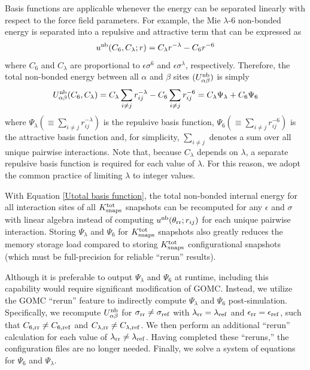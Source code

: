 \documentclass[journal=jced,manuscript=article]{achemso}
\begin{document}
Basis functions are applicable whenever the energy can be separated linearly with respect to the force field parameters. For example, the Mie $\lambda$-6 non-bonded energy is separated into a repulsive and attractive term that can be expressed as
\begin{equation} \label{Mie basis function}
u^{\rm nb}(C_6,C_\lambda;r) = C_\lambda r^{-\lambda} - C_6 r^{-6}
\end{equation} 
where $C_6$ and $C_\lambda$ are proportional to $\epsilon \sigma^6$ and $\epsilon \sigma^\lambda$, respectively. Therefore, the total non-bonded energy between all $\alpha$ and $\beta$ sites $(U_{\alpha\beta}^{\rm nb})$ is simply
\begin{equation} \label{Utotal basis function}
U_{\alpha\beta}^{\rm nb}(C_6,C_\lambda) = C_\lambda \sum_{i \neq j} r_{ij}^{-\lambda} - C_6 \sum_{i \neq j} r_{ij}^{-6} = C_\lambda \Psi_{\lambda} + C_6 \Psi_{6}
\end{equation}
where $\Psi_{\lambda} (\equiv \sum_{i \neq j} r_{ij}^{-\lambda})$ is the repulsive basis function, $\Psi_{6} (\equiv \sum_{i \neq j} r_{ij}^{-6})$ is the attractive basis function and, for simplicity, $\sum_{i \neq j}$ denotes a sum over all unique pairwise interactions. Note that, because $C_\lambda$ depends on $\lambda$, a separate repulsive basis function is required for each value of $\lambda$. For this reason, we adopt the common practice of limiting $\lambda$ to integer values.

With Equation \ref{Utotal basis function}, the total non-bonded internal energy for all interaction sites of all $K^{\rm tot}_{\rm snaps}$ snapshots can be recomputed for any $\epsilon$ and $\sigma$ with linear algebra instead of computing $u^{\rm nb}(\theta_{\rm rr};r_{ij})$ for each unique pairwise interaction. Storing $\Psi_{\lambda}$ and $\Psi_{6}$ for $K^{\rm tot}_{\rm snaps}$ snapshots also greatly reduces the memory storage load compared to storing $K^{\rm tot}_{\rm snaps}$ configurational snapshots (which must be full-precision for reliable ``rerun'' results). 

Although it is preferable to output $\Psi_{\lambda}$ and $\Psi_{6}$ at runtime, including this capability would require significant modification of GOMC. Instead, we utilize the GOMC ``rerun'' feature to indirectly compute $\Psi_{\lambda}$ and $\Psi_{6}$ post-simulation. Specifically, we recompute $U_{\alpha\beta}^{\rm nb}$ for $\sigma_{\rm rr} \neq \sigma_{\rm ref}$ with $\lambda_{\rm rr} = \lambda_{\rm ref}$ and $\epsilon_{\rm rr} = \epsilon_{\rm ref}$, such that $C_{6\rm{, rr}} \neq C_{6\rm{, ref}}$ and $C_{\lambda \rm{, rr}} \neq C_{\lambda \rm{, ref}}$. We then perform an additional ``rerun'' calculation for each value of $\lambda_{\rm rr} \neq \lambda_{\rm ref}$. Having completed these ``reruns,'' the configuration files are no longer needed. Finally, we solve a system of equations for $\Psi_{6}$ and $\Psi_{\lambda}$. 
\end{document}
